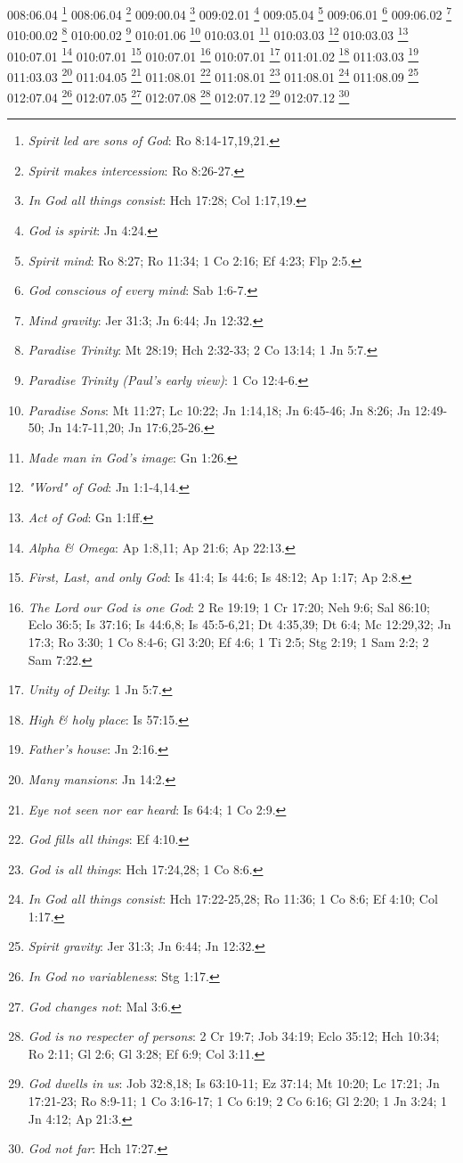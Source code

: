 {008:06.04 \footnote{\textit{Spirit led are sons of God}: Ro 8:14-17,19,21.}
008:06.04 \footnote{\textit{Spirit makes intercession}: Ro 8:26-27.}
009:00.04 \footnote{\textit{In God all things consist}: Hch 17:28; Col 1:17,19.}
009:02.01 \footnote{\textit{God is spirit}: Jn 4:24.}
009:05.04 \footnote{\textit{Spirit mind}: Ro 8:27; Ro 11:34; 1 Co 2:16; Ef 4:23; Flp 2:5.}
009:06.01 \footnote{\textit{God conscious of every mind}: Sab 1:6-7.}
009:06.02 \footnote{\textit{Mind gravity}: Jer 31:3; Jn 6:44; Jn 12:32.}
010:00.02 \footnote{\textit{Paradise Trinity}: Mt 28:19; Hch 2:32-33; 2 Co 13:14; 1 Jn 5:7.}
010:00.02 \footnote{\textit{Paradise Trinity (Paul's early view)}: 1 Co 12:4-6.}
010:01.06 \footnote{\textit{Paradise Sons}: Mt 11:27; Lc 10:22; Jn 1:14,18; Jn 6:45-46; Jn 8:26; Jn 12:49-50; Jn 14:7-11,20; Jn 17:6,25-26.}
010:03.01 \footnote{\textit{Made man in God's image}: Gn 1:26.}
010:03.03 \footnote{\textit{"Word" of God}: Jn 1:1-4,14.}
010:03.03 \footnote{\textit{Act of God}: Gn 1:1ff.}
010:07.01 \footnote{\textit{Alpha & Omega}: Ap 1:8,11; Ap 21:6; Ap 22:13.}
010:07.01 \footnote{\textit{First, Last, and only God}: Is 41:4; Is 44:6; Is 48:12; Ap 1:17; Ap 2:8.}
010:07.01 \footnote{\textit{The Lord our God is one God}: 2 Re 19:19; 1 Cr 17:20; Neh 9:6; Sal 86:10; Eclo 36:5; Is 37:16; Is 44:6,8; Is 45:5-6,21; Dt 4:35,39; Dt 6:4; Mc 12:29,32; Jn 17:3; Ro 3:30; 1 Co 8:4-6; Gl 3:20; Ef 4:6; 1 Ti 2:5; Stg 2:19; 1 Sam 2:2; 2 Sam 7:22.}
010:07.01 \footnote{\textit{Unity of Deity}: 1 Jn 5:7.}
011:01.02 \footnote{\textit{High & holy place}: Is 57:15.}
011:03.03 \footnote{\textit{Father's house}: Jn 2:16.}
011:03.03 \footnote{\textit{Many mansions}: Jn 14:2.}
011:04.05 \footnote{\textit{Eye not seen nor ear heard}: Is 64:4; 1 Co 2:9.}
011:08.01 \footnote{\textit{God fills all things}: Ef 4:10.}
011:08.01 \footnote{\textit{God is all things}: Hch 17:24,28; 1 Co 8:6.}
011:08.01 \footnote{\textit{In God all things consist}: Hch 17:22-25,28; Ro 11:36; 1 Co 8:6; Ef 4:10; Col 1:17.}
011:08.09 \footnote{\textit{Spirit gravity}: Jer 31:3; Jn 6:44; Jn 12:32.}
012:07.04 \footnote{\textit{In God no variableness}: Stg 1:17.}
012:07.05 \footnote{\textit{God changes not}: Mal 3:6.}
012:07.08 \footnote{\textit{God is no respecter of persons}: 2 Cr 19:7; Job 34:19; Eclo 35:12; Hch 10:34; Ro 2:11; Gl 2:6; Gl 3:28; Ef 6:9; Col 3:11.}
012:07.12 \footnote{\textit{God dwells in us}: Job 32:8,18; Is 63:10-11; Ez 37:14; Mt 10:20; Lc 17:21; Jn 17:21-23; Ro 8:9-11; 1 Co 3:16-17; 1 Co 6:19; 2 Co 6:16; Gl 2:20; 1 Jn 3:24; 1 Jn 4:12; Ap 21:3.}
012:07.12 \footnote{\textit{God not far}: Hch 17:27.}
}
